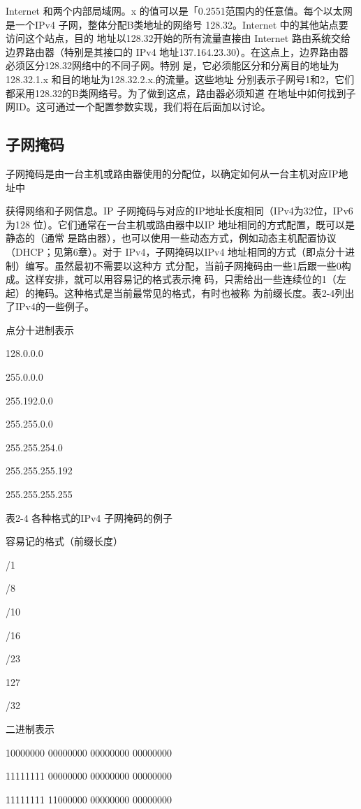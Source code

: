 Internet 和两个内部局域网。x 的值可以是「0.2551范围内的任意值。每个以太网是一个IPv4
子网，整体分配B类地址的网络号 128.32。Internet 中的其他站点要访问这个站点，目的
地址以128.32开始的所有流量直接由 Internet 路由系统交给边界路由器（特别是其接口的
IPv4 地址137.164.23.30）。在这点上，边界路由器必须区分128.32网络中的不同子网。特别
是，它必须能区分和分离目的地址为128.32.1.x 和目的地址为128.32.2.x.的流量。这些地址
分别表示子网号1和2，它们都采用128.32的B类网络号。为了做到这点，路由器必须知道
在地址中如何找到子网ID。这可通过一个配置参数实现，我们将在后面加以讨论。

\subsection{子网掩码}
子网掩码是由一台主机或路由器使用的分配位，以确定如何从一台主机对应IP地址中

获得网络和子网信息。IP 子网掩码与对应的IP地址长度相同（IPv4为32位，IPv6 为128
位）。它们通常在一台主机或路由器中以IP 地址相同的方式配置，既可以是静态的（通常
是路由器），也可以使用一些动态方式，例如动态主机配置协议（DHCP；见第6章）。对于
IPv4，子网掩码以IPv4 地址相同的方式（即点分十进制）编写。虽然最初不需要以这种方
式分配，当前子网掩码由一些1后跟一些0构成。这样安排，就可以用容易记的格式表示掩
码，只需给出一些连续位的1（左起）的掩码。这种格式是当前最常见的格式，有时也被称
为前缀长度。表2-4列出了IPv4的一些例子。

点分十进制表示

128.0.0.0

255.0.0.0

255.192.0.0

255.255.0.0

255.255.254.0

255.255.255.192

255.255.255.255

表2-4 各种格式的IPv4 子网掩码的例子

容易记的格式（前缀长度）

/1

/8

/10

/16

/23

127

/32

二进制表示

10000000 00000000 00000000 00000000

11111111 00000000 00000000 00000000

11111111 11000000 00000000 00000000

